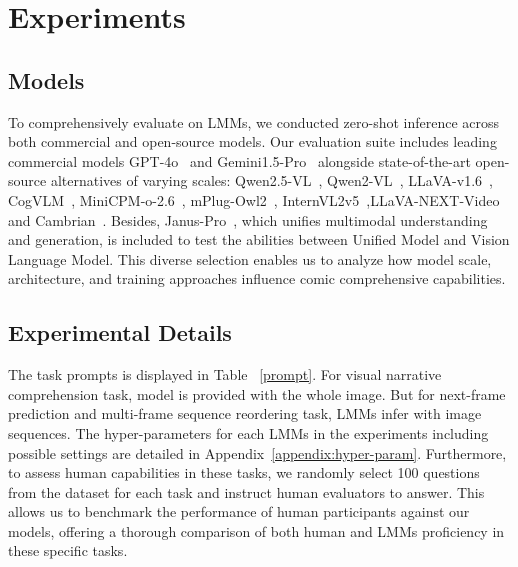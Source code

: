 \section{Experiments}

\subsection{Models}
To comprehensively evaluate on LMMs, we conducted zero-shot inference across both commercial and open-source models. Our evaluation suite includes leading commercial models GPT-4o~\cite{hurst2024gpt40} and Gemini1.5-Pro~\cite{Gemini} alongside state-of-the-art open-source alternatives of varying scales: Qwen2.5-VL~\cite{qwen2.5-VL}, Qwen2-VL~\cite{wang2024qwen2}, LLaVA-v1.6~\cite{liu2023llava}, CogVLM~\cite{wang2023cogvlm}, MiniCPM-o-2.6~\cite{yao2024minicpm}, mPlug-Owl2~\cite{ye2023mplugowl2}, InternVL2v5~\cite{chen2024internvl},LLaVA-NEXT-Video~\cite{zhang2024llavanextvideo} and Cambrian~\cite{tong2024cambrian1}. Besides, Janus-Pro~\cite{chen2025januspro}, which unifies multimodal understanding and generation, is included to test the abilities between Unified Model and Vision Language Model.  This diverse selection enables us to analyze how model scale, architecture, and training approaches influence comic comprehensive capabilities. 



\subsection{Experimental Details}
The task prompts is displayed in Table ~\ref{prompt}. For visual narrative comprehension task, model is provided with the whole image. But for next-frame prediction and multi-frame sequence reordering task, LMMs infer with image sequences.
The hyper-parameters for each LMMs in the experiments including possible settings are detailed in Appendix~\ref{appendix:hyper-param}. Furthermore, to assess human capabilities in these tasks, we randomly select 100 questions from the dataset for each task and instruct human evaluators to answer. This allows us to benchmark the performance of human participants against our models, offering a thorough comparison of both human and LMMs proficiency in these specific tasks. 


